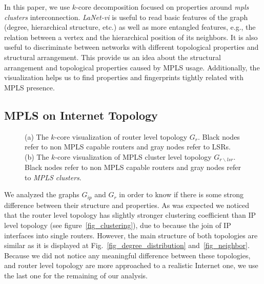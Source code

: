 In this paper, we use $k$-core decomposition focused on properties around
\textit{mpls clusters} interconnection.  \textit{LaNet-vi} is useful to read
basic features of the graph (degree, hierarchical structure, etc.) as well as
more entangled features, e.g., the relation between a vertex and the
hierarchical position of its neighbors. It is also useful to  discriminate
between networks with different topological properties and structural arrangement.
This provide us an idea about the structural arrangement and topological
properties caused by MPLS usage. Additionally, the visualization helps us to
find properties and fingerprints tightly related with MPLS presence.

\subsection{MPLS on Internet Topology}\label{cluster.topo}
\begin{figure*}[!t]
  \begin{center}
\hfil
  \end{center}
  \caption{ (a) The $k$-core visualization of router level topology $G_{r}$.
  Black nodes refer to non MPLS capable routers and gray nodes refer to LSRs.
  (b) The $k$-core visualization of MPLS cluster level topology 
  $G_{r\backslash lsr}$. Black nodes refer to non MPLS capable routers and gray
  nodes refer to \textit{MPLS clusters}.} 
  \label{fig_kcore_overview}
\end{figure*}

We analyzed the graphs $G_{ip}$ and $G_{r}$ in order to know if there is some
strong difference between their structure and properties. As was expected we
noticed that the router level topology has slightly stronger clustering
coefficient than IP level topology (see figure~\ref{fig_clustering}), due to
because the join of IP interfaces into single routers. However, the main
structure of both topologies are similar as it is displayed at
Fig.~\ref{fig_degree_distribution} and~\ref{fig_neighbor}. Because we did not
notice any meaningful difference between these topologies, and router level
topology are more approached to a realistic Internet  one, we use the last one
for the remaining of our analysis.

